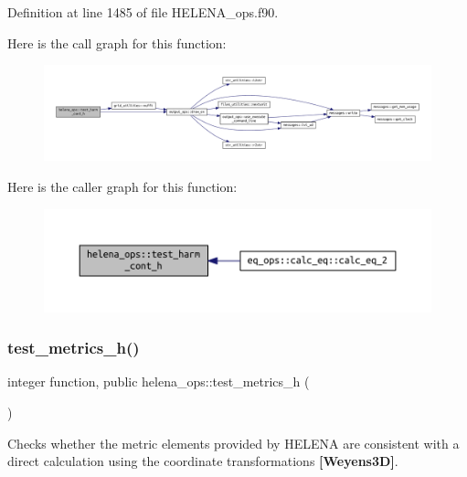Definition at line 1485 of file H\+E\+L\+E\+N\+A\+\_\+ops.\+f90.

Here is the call graph for this function\+:\nopagebreak
\begin{figure}[H]
\begin{center}
\leavevmode
\includegraphics[width=350pt]{namespacehelena__ops_a83f2ad5dc967c7bae287b60fddb8eb0a_cgraph}
\end{center}
\end{figure}
Here is the caller graph for this function\+:\nopagebreak
\begin{figure}[H]
\begin{center}
\leavevmode
\includegraphics[width=350pt]{namespacehelena__ops_a83f2ad5dc967c7bae287b60fddb8eb0a_icgraph}
\end{center}
\end{figure}
\mbox{\label{namespacehelena__ops_a0f156b3653264fb016d6d311eb59114c}} 
\subsubsection{\texorpdfstring{test\+\_\+metrics\+\_\+h()}{test\_metrics\_h()}}
{\footnotesize\ttfamily integer function, public helena\+\_\+ops\+::test\+\_\+metrics\+\_\+h (\begin{DoxyParamCaption}{ }\end{DoxyParamCaption})}



Checks whether the metric elements provided by H\+E\+L\+E\+NA are consistent with a direct calculation using the coordinate transformations {\bfseries [Weyens3D]}. 

